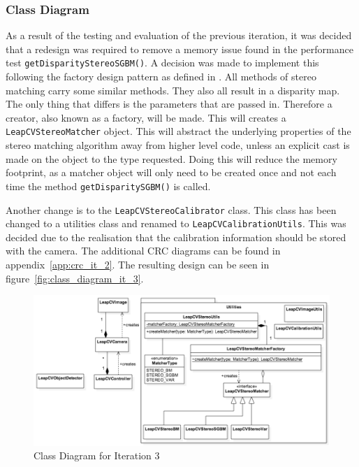 \documentclass[11pt,oneside]{report}
\newcommand\code[1]{\texttt{#1}}
\begin{document}
			\subsubsection{Class Diagram}
				As a result of the testing and evaluation of the previous iteration, it was decided that a redesign was required to remove a memory issue found in the performance test \code{getDisparityStereoSGBM()}.
				A decision was made to implement this following the factory design pattern as defined in .
				All methods of stereo matching carry some similar methods.
				They also all result in a disparity map.
				The only thing that differs is the parameters that are passed in.
				Therefore a creator, also known as a factory, will be made. 
				This will creates a \code{LeapCVStereoMatcher} object.
				This will abstract the underlying properties of the stereo matching algorithm away from higher level code, unless an explicit cast is made on the object to the type requested.
				Doing this will reduce the memory footprint, as a matcher object will only need to be created once and not each time the method \code{getDisparitySGBM()} is called.
				
				Another change is to the \code{LeapCVStereoCalibrator} class.
				This class has been changed to a utilities class and renamed to \code{LeapCVCalibrationUtils}.
				This was decided due to the realisation that the calibration information should be stored with the camera.							
				The additional CRC diagrams can be found in appendix~\ref{app:crc_it_2}.
				The resulting design can be seen in figure~\ref{fig:class_diagram_it_3}.
				
			\begin{figure}
		\centering
    			\includegraphics[width=\textheight, angle=90]{class_diagram_it_3}
    			\caption{Class Diagram for Iteration 3 \protect {\label{fig:class_diagram_it_3}}}
			
		\end{figure}			
\end{document}
